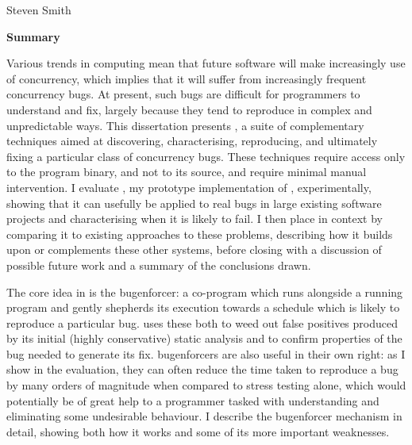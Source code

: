 \cleardoublepage
\begin{center}
\Large \mytitle
\end{center}
\begin{center}
\large Steven Smith
\end{center}
\vspace{10mm}
\begin{center}
\textbf{\large Summary}
\end{center}


\noindent
Various trends in computing mean that future software will make
increasingly use of concurrency, which implies that it will suffer
from increasingly frequent concurrency bugs.  At present, such bugs
are difficult for programmers to understand and fix, largely because
they tend to reproduce in complex and unpredictable ways.  This
dissertation presents {\technique}, a suite of complementary
techniques aimed at discovering, characterising, reproducing, and
ultimately fixing a particular class of concurrency bugs.  These
techniques require access only to the program binary, and not to its
source, and require minimal manual intervention.  I evaluate
{\implementation}, my prototype implementation of {\technique},
experimentally, showing that it can usefully be applied to real bugs
in large existing software projects and characterising when it is
likely to fail.  I then place {\technique} in context by comparing it
to existing approaches to these problems, describing how it builds
upon or complements these other systems, before closing with a
discussion of possible future work and a summary of the conclusions
drawn.

The core idea in {\technique} is the \gls{bugenforcer}: a co-program
which runs alongside a running program and gently shepherds its
execution towards a schedule which is likely to reproduce a particular
bug.  {\Technique} uses these both to weed out false positives
produced by its initial (highly conservative) static analysis and to
confirm properties of the bug needed to generate its fix.
\Glspl{bugenforcer} are also useful in their own right: as I show in
the evaluation, they can often reduce the time taken to reproduce a
bug by many orders of magnitude when compared to stress testing alone,
which would potentially be of great help to a programmer tasked with
understanding and eliminating some undesirable behaviour.  I describe
the \gls{bugenforcer} mechanism in detail, showing both how it works
and some of its more important weaknesses.

\vspace*{\fill}

